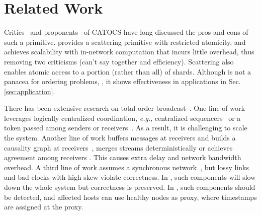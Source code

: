 \section{Related Work}
\label{sec:related}

Critics~\cite{cheriton1994understanding} and proponents~\cite{birman1994response,van1994bother} of CATOCS have long discussed the pros and cons of such a primitive.
\sys provides a scattering primitive with restricted atomicity, and achieves scalability with in-network computation that incurs little overhead, thus removing two criticisms (can't say together and efficiency).
Scattering also enables atomic access to a portion (rather than all) of shards.
Although \sys is not a panacea for ordering problems, , it shows effectiveness in applications in Sec.\ref{sec:application}.

There has been extensive research on total order broadcast~\cite{defago2004total}.
One line of work leverages logically centralized coordination, \textit{e.g.}, centralized sequencers~\cite{birman1991lightweight,kaashoek1996evaluation,eris} or a token passed among senders or receivers~\cite{rajagopalan1989token,moser1996totem,kim1997total,ekwall2004token}.
As a result, it is challenging to scale the system.
Another line of work buffers messages at receivers and builds a causality graph at receivers~\cite{lamport1978time,peterson1989preserving}, merges streams deterministically or achieves agreement among receivers \cite{birman1987exploiting,chandra1996unreliable,pedone1998optimistic,junqueira2011zab}.
This causes extra delay and network bandwidth overhead.
A third line of work assumes a synchronous network~\cite{lamport1984using}, but lossy links and bad clocks with high skew violate correctness. In \sys{}, such components will slow down the whole system but correctness is preserved. In \sys{}, such components should be detected, and affected hosts can use healthy nodes as proxy, where timestamps are assigned at the proxy.

